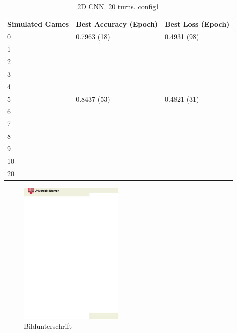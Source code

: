\begin{table}
	\centering
	\caption{2D CNN. 20 turns. config1}%
	\begin{tabular}{|l|l|l|}
		\hline
		Simulated Games & Best Accuracy (Epoch) & Best Loss (Epoch)\\
		\hline
		0 & 0.7963 (18) & 0.4931 (98) \\
		1 &  &  \\
		2 &  &  \\
		3 &  &  \\
		4 &  &  \\
		5 & 0.8437 (53) & 0.4821 (31) \\
		6 &  &  \\
		7 &  &  \\
		8 &  &  \\
		9 &  &  \\
		10 &  &  \\
		20 &  &  \\
		\hline
	\end{tabular}
\end{table}

\begin{figure}
 \includegraphics[width=5cm]{logos/titlepage.eps}
 \caption[Bild kurz]{Bildunterschrift}
 \label{fig:example}
\end{figure}
